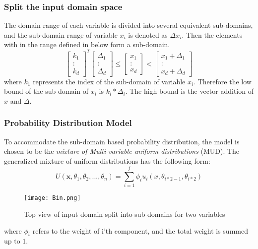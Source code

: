 \documentclass[conference]{IEEEtran}
\renewcommand{\vec}[1]{\mathbf{#1}}
\begin{document}
\subsubsection{Split the input domain space} The domain range of each variable is divided into several equivalent sub-domains, and the sub-domain range of variable \(x_{i}\) is denoted as \(\Delta x_{i}\). Then the elements with in the range defined in below form a sub-domain. 
\[
 \begin{bmatrix}
k_{1} \\
: \\
k_{d}
\end{bmatrix}^T
 \begin{bmatrix}
 \Delta_{1} \\
: \\
\Delta_{d}
\end{bmatrix}
\leq
 \begin{bmatrix}
	x_{1} \\
    : \\
x_{d}
\end{bmatrix}
<
 \begin{bmatrix}
x_{1} + \Delta_{1} \\
: \\
x_{d} + \Delta_{d}
\end{bmatrix}
\]
where \(k_{1}\) represents the index of the sub-domain of variable \(x_{i}\). Therefore the low bound of the sub-domain of \(x_{i}\) is \(k_{i}*\Delta_{i}\). The high bound is the vector addition of \(x\) and \(\Delta\).

\subsubsection{Probability Distribution Model}
To accommodate the sub-domain based probability distribution, the model is chosen to be the \emph{mixture of Multi-variable uniform distributions} (MUD).
The generalized mixture of uniform distributions has the following form:
\[U(\vec{x},\theta_{1},\theta_{2},...,\theta_{n}) = \sum_{i = 1}^{j}\phi_{i}u_{i}(x,\theta_{i*2-1},\theta_{i*2})\]

\begin{figure}[t]
	\hspace*{0.2cm}
	\texttt{[image: Bin.png]}
	\caption{Top view of input domain split into sub-domains for two variables}
	\label{fig:bins}
\end{figure}
where \(\phi_{i}\) refers to the weight of i'th component, and the total weight is summed up to \(1\).
\end{document}
